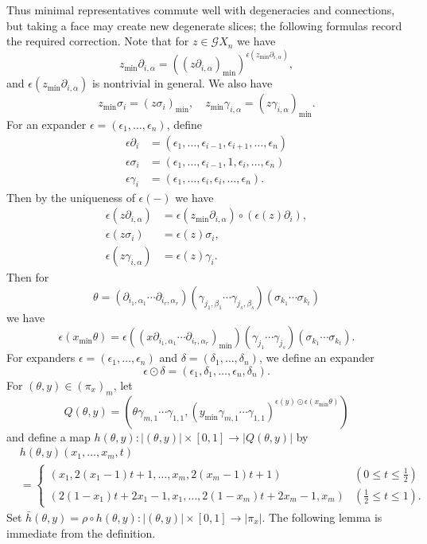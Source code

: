 \documentclass[oneside, 12pt]{amsart}
\numberwithin{equation}{section}
\theoremstyle{plain}
\theoremstyle{definition}
\theoremstyle{remark}
\begin{document}
	Thus minimal representatives commute well with degeneracies and connections, but taking a face may create new degenerate slices; the following formulas record the required correction. Note that for $z\in\mathcal{G}X_n$ we have
	\[
	z_{\min}\partial_{i,\alpha}=((z\partial_{i,\alpha})_{\min})^{\epsilon(z_{\min}\partial_{i,\alpha})},
	\]
	and $\epsilon(z_{\min}\partial_{i,\alpha})$ is nontrivial in general. We also have
	\[
	z_{\min}{\sigma_i}=(z\sigma_i)_{\min},\quad z_{\min}\gamma_{i,\alpha}=(z\gamma_{i,\alpha})_{\min}.
	\]
	For an expander $\epsilon=(\epsilon_1,\ldots,\epsilon_n)$, define
	\begin{align*}
		\epsilon\partial_i&=(\epsilon_1,\ldots,\epsilon_{i-1},\epsilon_{i+1},\ldots,\epsilon_n)\\
		\epsilon\sigma_i&=(\epsilon_1,\ldots,\epsilon_{i-1},1,\epsilon_i,\ldots,\epsilon_n)\\
		\epsilon\gamma_i&=(\epsilon_1,\ldots,\epsilon_i,\epsilon_i,\ldots,\epsilon_n).
	\end{align*}
	Then by the uniqueness of $\epsilon(-)$ we have
	\begin{align*}
		\epsilon(z\partial_{i,\alpha})&=\epsilon(z_{\min}\partial_{i,\alpha})\circ(\epsilon(z)\partial_i),\\
		\epsilon(z\sigma_i)&=\epsilon(z)\sigma_i,\\
		\epsilon(z\gamma_{i,\alpha})&=\epsilon(z)\gamma_i.
	\end{align*}
	Then for
	\[
	\theta=(\partial_{i_1,\alpha_1}\cdots\partial_{i_r,\alpha_r})(\gamma_{j_1,\beta_1}\cdots\gamma_{j_s,\beta_s})(\sigma_{k_1}\cdots\sigma_{k_t})
	\]
	we have
	\[
	\epsilon(x_{\min}\theta)=\epsilon((x\partial_{i_1,\alpha_1}\cdots\partial_{i_r,\alpha_r})_{\min})(\gamma_{j_1}\cdots\gamma_{j_s})(\sigma_{k_1}\cdots\sigma_{k_t}).
	\]
	For expanders $\epsilon=(\epsilon_1,\ldots,\epsilon_n)$ and $\delta=(\delta_1,\ldots,\delta_n)$, we define an expander
	\[
	\epsilon\odot\delta=(\epsilon_1,\delta_1,\ldots,\epsilon_n,\delta_n).
	\]
	For $(\theta,y)\in(\pi_x)_m$, let
	\[
	Q(\theta,y)=(\theta\gamma_{m,1}\cdots\gamma_{1,1},(y_\mathrm{min}\gamma_{m,1}\cdots\gamma_{1,1})^{\epsilon(y)\odot\epsilon(x_\mathrm{min}\theta)})
	\]
	and define a map $h(\theta,y)\colon|(\theta,y)|\times[0,1]\to|Q(\theta,y)|$ by
	\begin{align*}
		&h(\theta,y)(x_1,\ldots,x_m,t)\\
		&=
		\begin{cases}
			(x_1,2(x_1-1)t+1,\ldots,x_m,2(x_m-1)t+1)&(0\le t\le\frac{1}{2})\\
			(2(1-x_1)t+2x_1-1,x_1,\ldots,2(1-x_m)t+2x_m-1,x_m)&(\frac{1}{2}\le t\le 1).
		\end{cases}
	\end{align*}
	Set $\bar{h}(\theta,y)=\rho\circ h(\theta,y)\colon|(\theta,y)|\times[0,1]\to|\pi_x|$. The following lemma is immediate from the definition.
	
\end{document}
